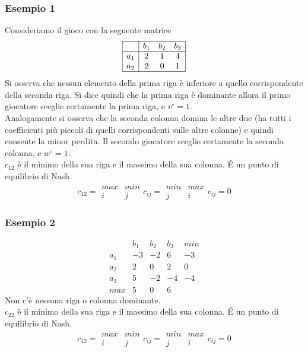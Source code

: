 \documentclass[12pt,a4paper]{article}
\begin{document}
\subsubsection{Esempio 1}
Consideriamo il gioco con la seguente matrice
$$\begin{array}{|c|ccc|}
\hline
& b_1 & b_2 & b_3\\ \hline
a_1 & 2 & 1 & 4\\
a_2 & 2 & 0 & 1\\ \hline
\end{array}$$
Si osserva che nessun elemento della prima riga è inferiore a quello corrispondente della seconda riga. Si dice quindi che la prima riga è dominante allora il primo giocatore sceglie certamente la prima riga, e $v^\circ = 1$.\\
Analogamente si osserva che la seconda colonna domina le altre due (ha tutti i coefficienti più
piccoli di quelli corrispondenti sulle altre colonne) e quindi consente la minor perdita. Il secondo
giocatore sceglie certamente la seconda colonna, e $w^\circ = 1$.\\
$c_{12}$ è il minimo della sua riga e il massimo della sua colonna. \'E un punto di equilibrio di Nash.
$$c_{12}=\begin{array}{c}max\\i\end{array}\begin{array}{c}min\\j\end{array}c_{ij} = \begin{array}{c}min\\j\end{array}\begin{array}{c}max\\i\end{array}c_{ij}= 0$$

\subsubsection{Esempio 2}
$$\begin{array}{c|ccc|c}
& b_1 & b_2 & b_3 & min\\ \hline
a_1 & -3 & -2 & 6 & -3\\
a_2 & 2 & 0 & 2 & 0\\ 
a_3 & 5 & -2 & -4 & -4\\\hline
max & 5 & 0 & 6 & 
\end{array}$$
Non c'è nessuna riga o colonna dominante.\\
$c_{22}$ è il minimo della sua riga e il massimo della sua colonna. \'E un punto di equilibrio di Nash.
$$c_{12}=\begin{array}{c}max\\i\end{array}\begin{array}{c}min\\j\end{array}c_{ij} = \begin{array}{c}min\\j\end{array}\begin{array}{c}max\\i\end{array}c_{ij}= 0$$
\end{document}
